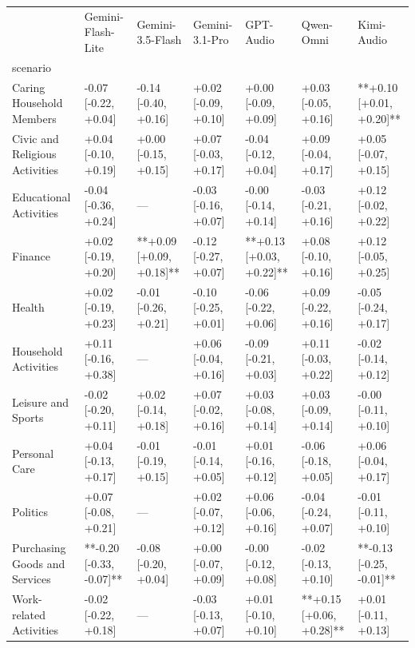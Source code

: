 \begin{tabular}{lllllll}
\toprule
 & Gemini-Flash-Lite & Gemini-3.5-Flash & Gemini-3.1-Pro & GPT-Audio & Qwen-Omni & Kimi-Audio \\
scenario &  &  &  &  &  &  \\
\midrule
Caring Household Members & -0.07 [-0.22, +0.04] & -0.14 [-0.40, +0.16] & +0.02 [-0.09, +0.10] & +0.00 [-0.09, +0.09] & +0.03 [-0.05, +0.16] & **+0.10 [+0.01, +0.20]** \\
Civic and Religious Activities & +0.04 [-0.10, +0.19] & +0.00 [-0.15, +0.15] & +0.07 [-0.03, +0.17] & -0.04 [-0.12, +0.04] & +0.09 [-0.04, +0.17] & +0.05 [-0.07, +0.15] \\
Educational Activities & -0.04 [-0.36, +0.24] & — & -0.03 [-0.16, +0.07] & -0.00 [-0.14, +0.14] & -0.03 [-0.21, +0.16] & +0.12 [-0.02, +0.22] \\
Finance & +0.02 [-0.19, +0.20] & **+0.09 [+0.09, +0.18]** & -0.12 [-0.27, +0.07] & **+0.13 [+0.03, +0.22]** & +0.08 [-0.10, +0.16] & +0.12 [-0.05, +0.25] \\
Health & +0.02 [-0.19, +0.23] & -0.01 [-0.26, +0.21] & -0.10 [-0.25, +0.01] & -0.06 [-0.22, +0.06] & +0.09 [-0.22, +0.16] & -0.05 [-0.24, +0.17] \\
Household Activities & +0.11 [-0.16, +0.38] & — & +0.06 [-0.04, +0.16] & -0.09 [-0.21, +0.03] & +0.11 [-0.03, +0.22] & -0.02 [-0.14, +0.12] \\
Leisure and Sports & -0.02 [-0.20, +0.11] & +0.02 [-0.14, +0.18] & +0.07 [-0.02, +0.16] & +0.03 [-0.08, +0.14] & +0.03 [-0.09, +0.14] & -0.00 [-0.11, +0.10] \\
Personal Care & +0.04 [-0.13, +0.17] & -0.01 [-0.19, +0.15] & -0.01 [-0.14, +0.05] & +0.01 [-0.16, +0.12] & -0.06 [-0.18, +0.05] & +0.06 [-0.04, +0.17] \\
Politics & +0.07 [-0.08, +0.21] & — & +0.02 [-0.07, +0.12] & +0.06 [-0.06, +0.16] & -0.04 [-0.24, +0.07] & -0.01 [-0.11, +0.10] \\
Purchasing Goods and Services & **-0.20 [-0.33, -0.07]** & -0.08 [-0.20, +0.04] & +0.00 [-0.07, +0.09] & -0.00 [-0.12, +0.08] & -0.02 [-0.13, +0.10] & **-0.13 [-0.25, -0.01]** \\
Work-related Activities & -0.02 [-0.22, +0.18] & — & -0.03 [-0.13, +0.07] & +0.01 [-0.10, +0.10] & **+0.15 [+0.06, +0.28]** & +0.01 [-0.11, +0.13] \\
\bottomrule
\end{tabular}
